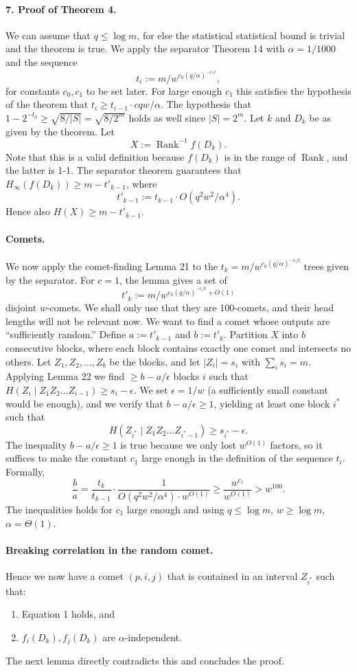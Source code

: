 \paragraph{7. Proof of Theorem 4.}
We can assume that $q\leq\log m$, for else the statistical statistical bound is trivial and the theorem is true. We apply the separator Theorem 14 with $\alpha=1/1000$ and the sequence
\[t_i:=m/w^{c_0(q/\alpha)^{-c_1i}},\]
for constants $c_0,c_1$ to be set later. For large enough $c_1$ this satisfies the hypothesis of the theorem that $t_i\geq t_{i-1}\cdot cqw/\alpha$. The hypothesis that $1-2^{-t_0}\geq\sqrt{8/|S|}=\sqrt{8/2^m}$ holds as well since $|S|=2^m$.
Let $k$ and $D_k$ be as given by the theorem. Let
\[X:=\operatorname{Rank}^{-1}f(D_k).\]
Note that this is a valid definition because $f(D_k)$ is in the range of $\operatorname{Rank}$, and the latter is 1-1. The separator theorem guarantees that $H_\infty(f(D_k))\geq m-t'_{k-1}$, where
\[t'_{k-1}:=t_{k-1}\cdot O(q^2w^2/\alpha^4).\]
Hence also $H(X)\geq m-t'_{k-1}$.
\paragraph{Comets.}
We now apply the comet-finding Lemma 21 to the $t_k=m/w^{c_0(q/\alpha)^{-c_1k}}$ trees given by the separator. For $c=1$, the lemma gives a set of
\[t'_k:=m/w^{c_0(q/\alpha)^{-c_1k}+O(1)}\]
disjoint $w$-comets. We shall only use that they are 100-comets, and their head lengths will not be relevant now. We want to find a comet whose outputs are ``sufficiently random.''
Define $a:=t'_{k-1}$ and $b:=t'_k$.
Partition $X$ into $b$ consecutive blocks, where each block contains exactly one comet and intersects no others. Let $Z_1,Z_2,\ldots,Z_b$ be the blocks, and let $|Z_i|=s_i$ with $\sum_i s_i=m$. Applying Lemma 22 we find $\geq b-a/\epsilon$ blocks $i$ such that $H(Z_i\mid Z_1Z_2\ldots Z_{i-1})\geq s_i-\epsilon$. We set $\epsilon=1/w$ (a sufficiently small constant would be enough), and we verify that $b-a/\epsilon\geq1$, yielding at least one block $i^*$ such that
\[H(Z_{i^*}\mid Z_1Z_2\ldots Z_{i^*-1})\geq s_{i^*}-\epsilon.\tag{1}\]
The inequality $b-a/\epsilon\geq1$ is true because we only lost $w^{O(1)}$ factors, so it suffices to make the constant $c_1$ large enough in the definition of the sequence $t_i$. Formally,
\[\frac ba=\frac{t_k}{t_{k-1}}\cdot\frac1{O(q^2w^2/\alpha^4)\cdot w^{O(1)}}\geq\frac{w^{c_1}}{w^{O(1)}}>w^{100}.\]
The inequalities holds for $c_1$ large enough and using $q\leq\log m$, $w\geq\log m$, $\alpha=\Theta(1)$.
\paragraph{Breaking correlation in the random comet.}
Hence we now have a comet $(p,i,j)$ that is contained in an interval $Z_{i^*}$ such that:
\begin{enumerate}
\item Equation 1 holds, and
\item $f_i(D_k),f_j(D_k)$ are $\alpha$-independent.
\end{enumerate}
The next lemma directly contradicts this and concludes the proof.
